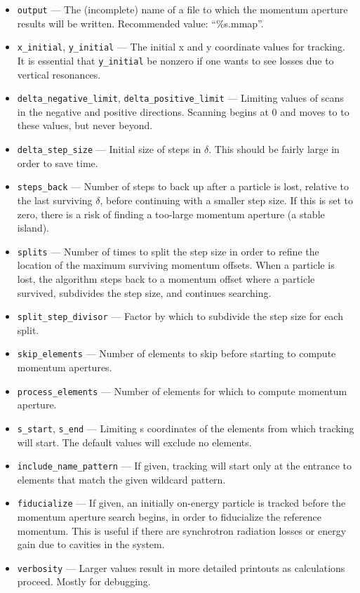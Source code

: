 \documentclass[11pt]{article}
\begin{document}
\begin{itemize}
\item \verb|output| --- The (incomplete) name of a file to which the momentum aperture results will be written.
  Recommended value: ``\%s.mmap''.
\item \verb|x_initial|, \verb|y_initial| --- The initial x and y coordinate values for tracking. It is essential
 that \verb|y_initial| be nonzero if one wants to see losses due to vertical resonances.  
\item \verb|delta_negative_limit|, \verb|delta_positive_limit| ---
Limiting values of scans in the negative and positive
directions. Scanning begins at 0 and moves to to these values, but never beyond. 
\item \verb|delta_step_size| --- Initial size of steps in $\delta$.  This should
 be fairly large in order to save time.

\item \verb|steps_back| --- Number of steps to back up after a particle is lost,
 relative to the last surviving $\delta$, before continuing with a smaller step size.
 If this is set to zero, there is a risk of finding a too-large momentum aperture
 (a stable island).

\item \verb|splits| --- Number of times to split the step size in
 order to refine the location of the maximum surviving momentum
 offsets.  When a particle is lost, the algorithm steps back to a momentum offset
 where a particle survived, subdivides the step size, and continues searching.  

\item \verb|split_step_divisor| --- Factor by which to subdivide the step size
  for each split.

\item \verb|skip_elements| --- Number of elements to skip before starting to
  compute momentum apertures.

\item \verb|process_elements| --- Number of elements for which to compute
  momentum aperture.

\item \verb|s_start|, \verb|s_end| --- Limiting s coordinates of the
 elements from which tracking will start.  The default values will
 exclude no elements.

\item \verb|include_name_pattern| --- If given, tracking will start
only at the entrance to elements that match the given wildcard
pattern.

\item \verb|fiducialize| --- If given, an initially on-energy particle is tracked before
 the momentum aperture search begins, in order to fiducialize the reference momentum.
 This is useful if there are synchrotron radiation losses or energy gain due to cavities
 in the system.

\item \verb|verbosity| --- Larger values result in more detailed
printouts as calculations proceed.  Mostly for debugging.
\end{itemize}
\end{document}
